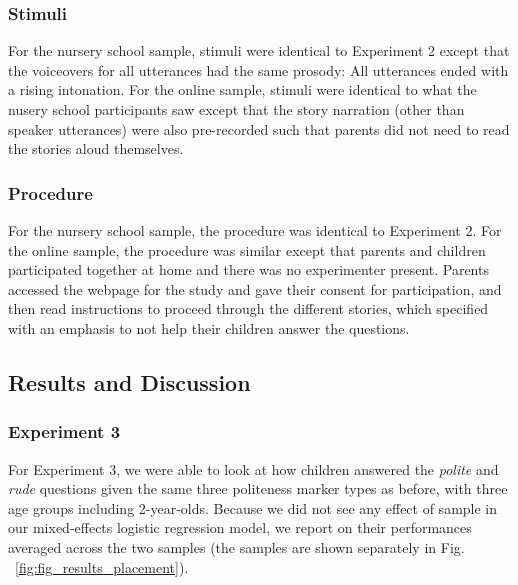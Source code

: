 \documentclass[10pt, letterpaper]{article}
\begin{document}
\subsubsection{Stimuli}\label{stimuli}

For the nursery school sample, stimuli were identical to Experiment 2
except that the voiceovers for all utterances had the same prosody: All
utterances ended with a rising intonation. For the online sample,
stimuli were identical to what the nusery school participants saw except
that the story narration (other than speaker utterances) were also
pre-recorded such that parents did not need to read the stories aloud
themselves.

\subsubsection{Procedure}\label{procedure-2}

For the nursery school sample, the procedure was identical to Experiment
2. For the online sample, the procedure was similar except that parents
and children participated together at home and there was no experimenter
present. Parents accessed the webpage for the study and gave their
consent for participation, and then read instructions to proceed through
the different stories, which specified with an emphasis to not help
their children answer the questions.

\subsection{Results and Discussion}\label{results-and-discussion-2}

\subsubsection{Experiment 3}\label{experiment-3-1}

For Experiment 3, we were able to look at how children answered the
\emph{polite} and \emph{rude} questions given the same three politeness
marker types as before, with three age groups including 2-year-olds.
Because we did not see any effect of sample in our mixed-effects
logistic regression model, we report on their performances averaged
across the two samples (the samples are shown separately in Fig.
~\ref{fig:fig_results_placement}).
\end{document}

